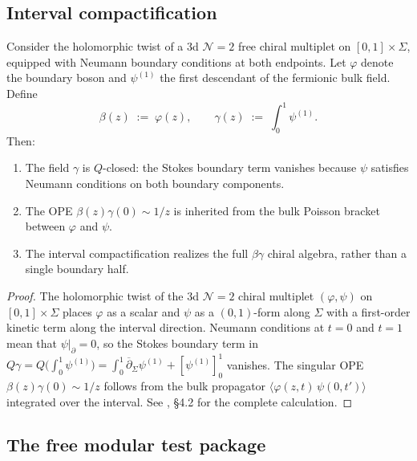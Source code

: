 \subsection{Interval compactification}

\begin{proposition}
\label{prop:betagamma-interval-compactification}
Consider the holomorphic twist of a 3d\/ $\mathcal{N}=2$ free chiral multiplet
on $[0,1] \times \Sigma$, equipped with Neumann boundary conditions at both
endpoints. Let $\varphi$ denote the boundary boson and $\psi^{(1)}$ the
first descendant of the fermionic bulk field. Define
\[
 \beta(z) \;:=\; \varphi(z), \qquad
 \gamma(z) \;:=\; \int_0^1 \psi^{(1)}.
\]
Then:
\begin{enumerate}
\item The field $\gamma$ is $Q$-closed: the Stokes boundary term vanishes
 because $\psi$ satisfies Neumann conditions on both boundary components.
\item The OPE $\beta(z)\gamma(0) \sim 1/z$ is inherited from the bulk
 Poisson bracket between $\varphi$ and $\psi$.
\item The interval compactification realizes the full $\beta\gamma$ chiral
 algebra, rather than a single boundary half.
\end{enumerate}
\end{proposition}

\begin{proof}
The holomorphic twist of the 3d $\mathcal{N}=2$ chiral multiplet
$(\varphi, \psi)$ on $[0,1] \times \Sigma$ places $\varphi$ as a scalar
and $\psi$ as a $(0,1)$-form along $\Sigma$ with a first-order kinetic
term along the interval direction. Neumann conditions at $t=0$ and $t=1$
mean that $\psi|_{\partial} = 0$, so the Stokes boundary term in
$Q\gamma = Q\bigl(\int_0^1 \psi^{(1)}\bigr) = \int_0^1 \overline{\partial}_\Sigma \psi^{(1)} + [\psi^{(1)}]_0^1$
vanishes. The singular OPE $\beta(z)\gamma(0) \sim 1/z$ follows from the
bulk propagator $\langle \varphi(z,t)\, \psi(0,t') \rangle$ integrated
over the interval. See \cite{CDG20}, \S4.2 for the complete calculation.
\end{proof}

\subsection{The free modular test package}

